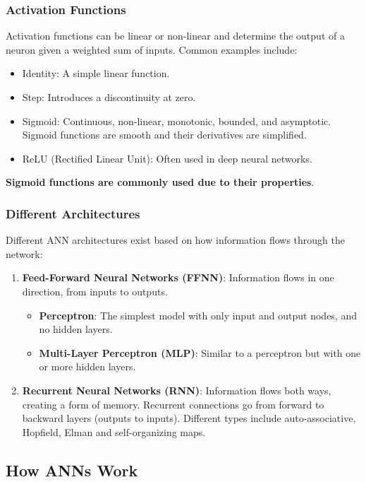 \subsubsection*{Activation Functions}
Activation functions can be linear or non-linear and determine the output of a neuron given a weighted sum of inputs. Common examples include:
\begin{itemize}
    \item Identity: A simple linear function.
    \item Step: Introduces a discontinuity at zero.
    \item Sigmoid: Continuous, non-linear, monotonic, bounded, and asymptotic. Sigmoid functions are smooth and their derivatives are simplified.
    \item ReLU (Rectified Linear Unit): Often used in deep neural networks.
\end{itemize}
\textbf{Sigmoid functions are commonly used due to their properties}.

\subsubsection*{Different Architectures}
Different ANN architectures exist based on how information flows through the network:
\begin{enumerate}
    \item \textbf{Feed-Forward Neural Networks (FFNN)}: Information flows in one direction, from inputs to outputs.
    \begin{itemize}
        \item \textbf{Perceptron}: The simplest model with only input and output nodes, and no hidden layers.
        \item \textbf{Multi-Layer Perceptron (MLP)}: Similar to a perceptron but with one or more hidden layers.
    \end{itemize}
    \item \textbf{Recurrent Neural Networks (RNN)}: Information flows both ways, creating a form of memory. Recurrent connections go from forward to backward layers (outputs to inputs). Different types include auto-associative, Hopfield, Elman and self-organizing maps.
\end{enumerate}

\subsection*{How ANNs Work}

